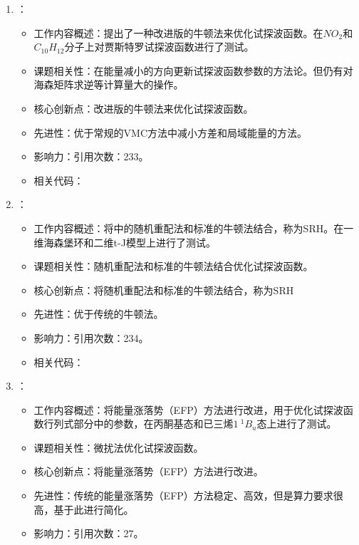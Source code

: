 \begin{enumerate}
        \item \citet{umrigar2005energy}：
            \begin{itemize}
                \item 工作内容概述：提出了一种改进版的牛顿法来优化试探波函数。在$NO_2$和$C_{10}H_{12}$分子上对贾斯特罗试探波函数进行了测试。
                \item 课题相关性：在能量减小的方向更新试探波函数参数的方法论。但仍有对海森矩阵求逆等计算量大的操作。
                \item 核心创新点：改进版的牛顿法来优化试探波函数。
                \item 先进性：优于常规的VMC方法中减小方差和局域能量的方法。
                \item 影响力：引用次数：233。
                \item 相关代码：
            \end{itemize}
            \item \citet{sorella2005wave}：
            \begin{itemize}
                \item 工作内容概述：将\citet{casula2004correlated}中的随机重配法和标准的牛顿法结合，称为SRH。在一维海森堡环和二维t-J模型上进行了测试。
                \item 课题相关性：随机重配法和标准的牛顿法结合优化试探波函数。
                \item 核心创新点：将随机重配法和标准的牛顿法结合，称为SRH
                \item 先进性：优于传统的牛顿法。
                \item 影响力：引用次数：234。
                \item 相关代码：
            \end{itemize}
        \item \citet{scemama2006simple}：
            \begin{itemize}
                \item 工作内容概述：将能量涨落势（EFP）方法进行改进，用于优化试探波函数行列式部分中的参数，在丙酮基态和已三烯$1~^{1}B_u$态上进行了测试。
                \item 课题相关性：微扰法优化试探波函数。
                \item 核心创新点：将能量涨落势（EFP）方法进行改进。
                \item 先进性：传统的能量涨落势（EFP）方法稳定、高效，但是算力要求很高，基于此进行简化。
                \item 影响力：引用次数：27。

\end{itemize}
\end{enumerate}
